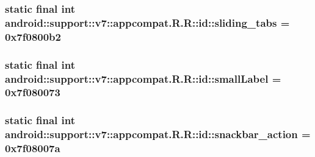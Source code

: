 \hypertarget{classandroid_1_1support_1_1v7_1_1appcompat_1_1_r_1_1id_7ba60e9f5eac90f0d083d92dc83a21c1}{
\subsubsection[{sliding\_\-tabs}]{\setlength{\rightskip}{0pt plus 5cm}static final int android::support::v7::appcompat.R.R::id::sliding\_\-tabs = 0x7f0800b2}}
\label{classandroid_1_1support_1_1v7_1_1appcompat_1_1_r_1_1id_7ba60e9f5eac90f0d083d92dc83a21c1}


\hypertarget{classandroid_1_1support_1_1v7_1_1appcompat_1_1_r_1_1id_cd9cef1da7030bce19e346b9f2e11506}{
\subsubsection[{smallLabel}]{\setlength{\rightskip}{0pt plus 5cm}static final int android::support::v7::appcompat.R.R::id::smallLabel = 0x7f080073}}
\label{classandroid_1_1support_1_1v7_1_1appcompat_1_1_r_1_1id_cd9cef1da7030bce19e346b9f2e11506}


\hypertarget{classandroid_1_1support_1_1v7_1_1appcompat_1_1_r_1_1id_575b788c3b66848bc47cdd916c9da860}{
\subsubsection[{snackbar\_\-action}]{\setlength{\rightskip}{0pt plus 5cm}static final int android::support::v7::appcompat.R.R::id::snackbar\_\-action = 0x7f08007a}}
\label{classandroid_1_1support_1_1v7_1_1appcompat_1_1_r_1_1id_575b788c3b66848bc47cdd916c9da860}


